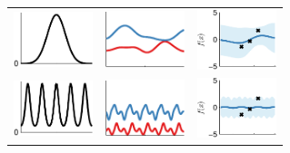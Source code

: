\newcommand{\fwb}{2.3cm}
\begin{figure}
\centering
\begin{tabular}{c|c|c}
\includegraphics[width=\fwb]{../figures/structure_examples/se_kernel} &  \includegraphics[width=\fwb]{../figures/structure_examples/se_kernel_draws} & \includegraphics[width=\fwb]{../figures/structure_examples/se_kernel_post} \\
\includegraphics[width=\fwb]{../figures/structure_examples/per_kernel} &  \includegraphics[width=\fwb]{../figures/structure_examples/per_kernel_draws} & \includegraphics[width=\fwb]{../figures/structure_examples/per_kernel_post} \\

\end{tabular}
\end{figure}
